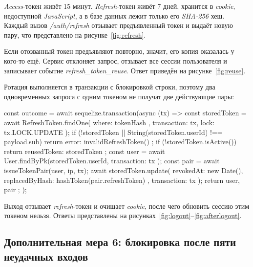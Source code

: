 \documentclass{stp}
\begin{document}
\textit{Access}-токен живёт 15 минут. \textit{Refresh}-токен живёт 7 дней, хранится в
\textit{cookie}, недоступной \textit{JavaScript}, а в базе данных лежит только его
\textit{SHA-256} хеш. Каждый вызов \textit{/auth/refresh} отзывает предъявленный токен и
выдаёт новую пару, что представлено на рисунке~\ref{fig:refresh}.


Если отозванный токен предъявляют повторно, значит, его копия оказалась
у кого-то ещё. Сервис отклоняет запрос, отзывает все сессии пользователя
и записывает событие \textit{refresh\_token\_reuse}. Ответ приведён на
рисунке~\ref{fig:reuse}.


Ротация выполняется в транзакции с блокировкой строки, поэтому два
одновременных запроса с одним токеном не получат две действующие пары:

\begin{stplisting}
const outcome = await sequelize.transaction(async (tx) => {
  const storedToken = await RefreshToken.findOne({
    where: { tokenHash }, transaction: tx,
    lock: tx.LOCK.UPDATE });
  if (!storedToken
    || String(storedToken.userId) !== payload.sub) {
    return { error: invalidRefreshToken() };
  }
  if (!storedToken.isActive()) {
    return { reusedToken: storedToken };
  }
  const user = await User.findByPk(storedToken.userId,
    { transaction: tx });
  const pair = await issueTokenPair(user, ip, tx);
  await storedToken.update({ revokedAt: new Date(),
    replacedByHash: hashToken(pair.refreshToken) },
    { transaction: tx });
  return { user, pair };
});
\end{stplisting}

Выход отзывает \textit{refresh}-токен и очищает \textit{cookie}, после чего обновить сессию
этим токеном нельзя. Ответы представлены на
рисунках~\ref{fig:logout}--\ref{fig:afterlogout}.



\subsection{Дополнительная мера 6: блокировка после пяти неудачных входов}
\end{document}
